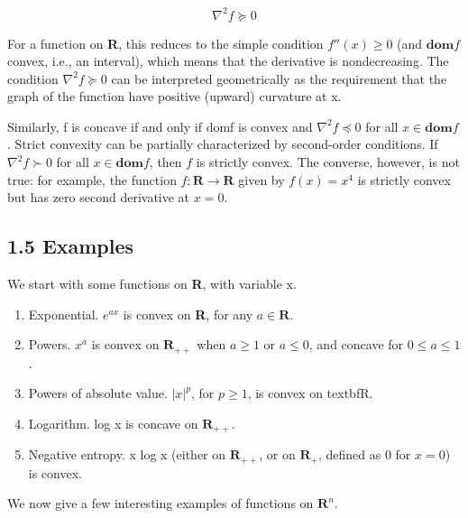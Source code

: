 \documentclass{article}
\begin{document}
\[
    \nabla^2f\succeq 0    
\]

For a function on \textbf{R}, this reduces to the simple condition $f''(x) \ge 0$ (and $\mathbf{dom}f$
convex, i.e., an interval), which means that the derivative is nondecreasing. The
condition $\nabla^2f\succeq 0$ can be interpreted geometrically as the requirement that the
graph of the function have positive (upward) curvature at x.

Similarly, f is concave if and only if domf is convex and $\nabla^2f\preceq 0$ for
all $x \in \mathbf{dom}f$. Strict convexity can be partially characterized by second-order
conditions. If $\nabla^2f\succ 0$ for all $x \in \mathbf{dom}f$, then $f$ is strictly convex. The
converse, however, is not true: for example, the function $f:\mathbf{R} \rightarrow \mathbf{R}$ given by
$f(x) = x^4$ is strictly convex but has zero second derivative at $x = 0$.

\subsection*{1.5 Examples}

We start with some functions on \textbf{R}, with variable x.

\begin{enumerate}
    \item Exponential. $e^{ax}$ is convex on \textbf{R}, for any $a \in \mathbf{R}$.
    \item Powers. $x^a$ is convex on $\mathbf{R}_{++}$ when $a \ge 1$ or $a \le 0$, and concave for $0 \le a \le 1$.
    \item Powers of absolute value. $|x|^p$, for $p \ge 1$, is convex on textbf{R}.
    \item Logarithm. log x is concave on $\mathbf{R}_{++}$.
    \item Negative entropy. x log x (either on $\mathbf{R}_{++}$, or on $\mathbf{R}_+$, defined as 0 for $x = 0$) is convex.
\end{enumerate}

We now give a few interesting examples of functions on $\mathbf{R}^n$.
\end{document}
